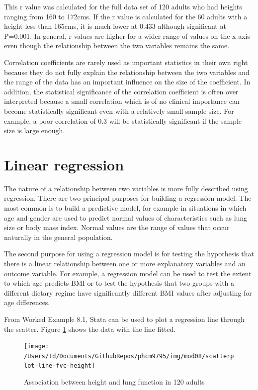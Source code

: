 \documentclass[
]{memoir}
\begin{document}
This r value was calculated for the full data set of 120 adults who had heights ranging from 160 to 172cms. If the r value is calculated for the 60 adults with a height less than 165cms, it is much lower at 0.433 although significant at P=0.001. In general, r values are higher for a wider range of values on the x axis even though the relationship between the two variables remains the same.

Correlation coefficients are rarely used as important statistics in their own right because they do not fully explain the relationship between the two variables and the range of the data has an important influence on the size of the coefficient. In addition, the statistical significance of the correlation coefficient is often over interpreted because a small correlation which is of no clinical importance can become statistically significant even with a relatively small sample size. For example, a poor correlation of 0.3 will be statistically significant if the sample size is large enough.

\hypertarget{linear-regression}{%
\section{Linear regression}\label{linear-regression}}

The nature of a relationship between two variables is more fully described using regression. There are two principal purposes for building a regression model. The most common is to build a predictive model, for example in situations in which age and gender are used to predict normal values of characteristics such as lung size or body mass index. Normal values are the range of values that occur naturally in the general population.

The second purpose for using a regression model is for testing the hypothesis that there is a linear relationship between one or more explanatory variables and an outcome variable. For example, a regression model can be used to test the extent to which age predicts BMI or to test the hypothesis that two groups with a different dietary regime have significantly different BMI values after adjusting for age differences.

From Worked Example 8.1, Stata can be used to plot a regression line through the scatter. Figure \ref{fig:scatter-plot-line} shows the data with the line fitted.

\begin{figure}
\texttt{[image: /Users/td/Documents/GithubRepos/phcm9795/img/mod08/scatterplot-line-fvc-height]} \caption{Association between height and lung function in 120 adults}\label{fig:scatter-plot-line}
\end{figure}
\end{document}
